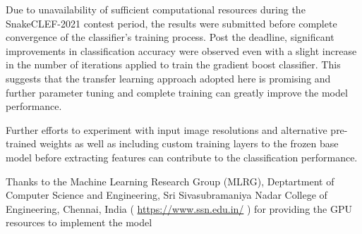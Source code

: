 \documentclass[
]{ceurart}
\begin{document}
Due to unavailability of sufficient computational resources during the SnakeCLEF-2021 contest period, the results were submitted before complete convergence of the classifier's training process. Post the deadline, significant improvements in classification accuracy were observed even with a slight increase in the number of iterations applied to train the gradient boost classifier. This suggests that the transfer learning approach adopted here is promising and further parameter tuning and complete training can greatly improve the model performance.

Further efforts to experiment with input image resolutions and alternative pre-trained weights \cite{picek} as well as including custom training layers to the frozen base model before extracting features \cite{zhong} can contribute to the classification performance.

\begin{acknowledgments}
  Thanks to the Machine Learning Research Group (MLRG), Deptartment of Computer Science and Engineering, Sri Sivasubramaniya Nadar College of Engineering, Chennai, India
  ( \url{https://www.ssn.edu.in/} ) for providing the GPU resources to implement the model
\end{acknowledgments}

  
\end{document}
